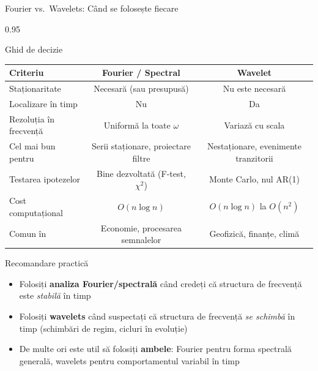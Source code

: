\documentclass[9pt, aspectratio=169, t]{beamer}
\begin{document}
\begin{frame}{Fourier vs.\ Wavelets: Când se folosește fiecare}
    \begin{cminipage}{0.95\textwidth}
    \vspace{-3mm}
    {\small
    \begin{block}{Ghid de decizie}
    \vspace{-2mm}
    \begin{center}
    \begin{tabular}{l|c|c}
        \toprule
        \textbf{Criteriu} & \textbf{Fourier / Spectral} & \textbf{Wavelet} \\
        \midrule
        Staționaritate & Necesară (sau presupusă) & Nu este necesară \\
        Localizare în timp & Nu & Da \\
        Rezoluția în frecvență & Uniformă la toate $\omega$ & Variază cu scala \\
        Cel mai bun pentru & Serii staționare, proiectare filtre & Nestaționare, evenimente tranzitorii \\
        Testarea ipotezelor & Bine dezvoltată (F-test, $\chi^2$) & Monte Carlo, nul AR(1) \\
        Cost computațional & $O(n \log n)$ & $O(n \log n)$ la $O(n^2)$ \\
        Comun în & Economie, procesarea semnalelor & Geofizică, finanțe, climă \\
        \bottomrule
    \end{tabular}
    \end{center}
    \end{block}
    }
    \vspace{-2mm}
    \begin{exampleblock}{Recomandare practică}
        \begin{itemize}\setlength{\itemsep}{0pt}
            \item Folosiți \textbf{analiza Fourier/spectrală} când credeți că structura de frecvență este \textit{stabilă} în timp
            \item Folosiți \textbf{wavelets} când suspectați că structura de frecvență \textit{se schimbă} în timp (schimbări de regim, cicluri în evoluție)
            \item De multe ori este util să folosiți \textbf{ambele}: Fourier pentru forma spectrală generală, wavelets pentru comportamentul variabil în timp
        \end{itemize}
    \end{exampleblock}
    \end{cminipage}
\end{frame}
\end{document}

